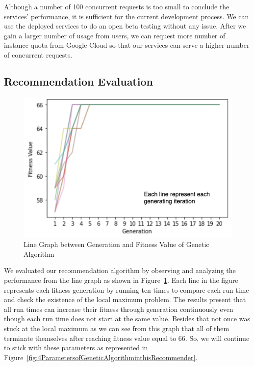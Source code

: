\documentclass[12pt,oneside,openright,a4paper]{cpe-english-project}
\begin{document}
Although a number of 100 concurrent requests is too small to conclude the services’ performance, it is sufficient for the current development process. We can use the deployed services to do an open beta testing without any issue. After we gain a larger number of usage from users, we can request more number of instance quota from Google Cloud so that our services can serve a higher number of concurrent requests.

\subsection{Recommendation Evaluation}


\begin{figure}[H]\centering
\includegraphics[width=350pt]{./images/4LineGraphbetweenGenerationandFitnessValueofGeneticAlgorithm.png}
\caption{Line Graph between Generation and Fitness Value of Genetic Algorithm}\label{fig:4LineGraphbetweenGenerationandFitnessValueofGeneticAlgorithm}
\end{figure}

We evaluated our recommendation algorithm by observing and analyzing the performance from the line graph as shown in Figure~\ref{fig:4LineGraphbetweenGenerationandFitnessValueofGeneticAlgorithm}. Each line in the figure represents each fitness generation by running ten times to compare each run time and check the existence of the local maximum problem. The results present that all run times can increase their fitness through generation continuously even though each run time does not start at the same value. Besides that not once was stuck at the local maximum as we can see from this graph that all of them terminate themselves after reaching fitness value equal to 66. So, we will continue to stick with these parameters as represented in Figure~\ref{fig:4ParametersofGeneticAlgorithminthisRecommender}.
\end{document}
